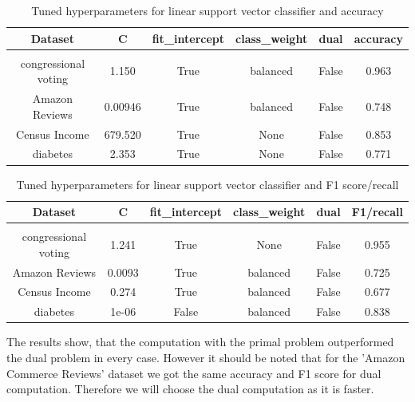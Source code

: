 \documentclass[a4paper,10pt]{article}
\begin{document}
\begin{table}[h!]
    \centering
    \begin{tabular}{|c|c|c|c|c|c|}
    \hline
    Dataset & \textsf{C} & \textsf{fit\_intercept} &  \textsf{class\_weight} & \textsf{dual} & accuracy \\
    \hline
    \multicolumn{6}{c}{\vspace{-0.4cm}} \\ %
    \hline
    congressional voting & 1.150 & True & balanced & False & 0.963 \\%
    \hline
    Amazon Reviews & 0.00946 & True & balanced & False & 0.748 \\%
    \hline
    Census Income & 679.520 & True & None & False & 0.853 \\%
    \hline
    diabetes & 2.353 & True & None & False  & 0.771 \\%
    \hline
    \end{tabular}
    \caption{Tuned hyperparameters for linear support vector classifier and accuracy} 
    \label{table:tu_hyp_svc_ac}
    \end{table}

\begin{table}[h!]
    \centering
    \begin{tabular}{|c|c|c|c|c|c|}
    \hline
    Dataset & \textsf{C} & \textsf{fit\_intercept} &  \textsf{class\_weight} & \textsf{dual} & F1/recall \\
    \hline
    \multicolumn{6}{c}{\vspace{-0.4cm}} \\ %
    \hline
    congressional voting & 1.241 & True & None & False & 0.955 \\%
    \hline
    Amazon Reviews & 0.0093 & True & balanced & False &  0.725 \\%
    \hline
    Census Income & 0.274 & True & balanced & False & 0.677 \\%
    \hline
    diabetes & 1e-06 & False & balanced & False  & 0.838 \\%
    \hline
    \end{tabular}
    \caption{Tuned hyperparameters for linear support vector classifier and F1 score/recall} 
    \label{table:tu_hyp_svc_f1}
    \end{table}
    
The results show, that the computation with the primal problem outperformed the dual problem in every case. However it should be noted that for the 'Amazon Commerce Reviews' dataset we got the same accuracy and F1 score for dual computation. Therefore we will choose the dual computation as it is faster.
\end{document}
